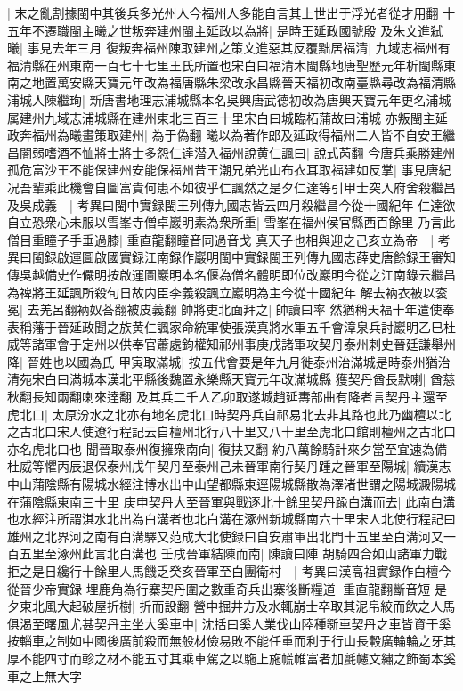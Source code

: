 |{
	末之亂割據閩中其後兵多光州人今福州人多能自言其上世出于浮光者從才用翻}
十五年不遷職閩主曦之世叛奔建州閩主延政以為將|{
	是時王延政國號殷}
及朱文進弑曦|{
	事見去年三月}
復叛奔福州陳取建州之策文進惡其反覆黜居福清|{
	九域志福州有福清縣在州東南一百七十七里王氏所置也宋白曰福清木閩縣地唐聖歷元年析閩縣東南之地置萬安縣天寶元年改為福唐縣朱梁改永昌縣晉天福初改南臺縣尋改為福清縣}
浦城人陳繼珣|{
	新唐書地理志浦城縣本名吳興唐武德初改為唐興天寶元年更名浦城属建州九域志浦城縣在建州東北三百三十里宋白曰城臨柘蒲故曰浦城}
亦叛閩主延政奔福州為曦畫策取建州|{
	為于偽翻}
曦以為著作郎及延政得福州二人皆不自安王繼昌闇弱嗜酒不恤將士將士多怨仁達潜入福州說黄仁諷曰|{
	說式芮翻}
今唐兵乘勝建州孤危富沙王不能保建州安能保福州昔王潮兄弟光山布衣耳取福建如反掌|{
	事見唐紀}
况吾輩乘此機會自圖富貴何患不如彼乎仁諷然之是夕仁達等引甲士突入府舍殺繼昌及吳成義　|{
	考異曰閩中實録閩王列傳九國志皆云四月殺繼昌今從十國紀年}
仁達欲自立恐衆心未服以雪峯寺僧卓巖明素為衆所重|{
	雪峯在福州侯官縣西百餘里}
乃言此僧目重瞳子手垂過膝|{
	重直龍翻瞳音同過音戈}
真天子也相與迎之己亥立為帝　|{
	考異曰閩録啟運圖啟國實録江南録作巖明閩中實録閩王列傳九國志薛史唐餘録王審知傳吳越備史作儼明按啟運圖巖明本名偃為僧名體明即位改巖明今從之江南錄云繼昌為禆將王延諷所殺旬日故内臣李義殺諷立巖明為主今從十國紀年}
解去衲衣被以衮冕|{
	去羌呂翻衲奴荅翻被皮義翻}
帥將吏北面拜之|{
	帥讀曰率}
然猶稱天福十年遣使奉表稱藩于晉延政聞之族黄仁諷家命統軍使張漢真將水軍五千會漳泉兵討巖明乙巳杜威等諸軍會于定州以供奉官蕭處鈞權知祁州事庚戌諸軍攻契丹泰州刺史晉廷謙舉州降|{
	晉姓也以國為氏}
甲寅取滿城|{
	按五代會要是年九月徙泰州治滿城是時泰州猶治清苑宋白曰滿城本漢北平縣後魏置永樂縣天寶元年改滿城縣}
獲契丹酋長默喇|{
	酋慈秋翻長知兩翻喇來逹翻}
及其兵二千人乙卯取遂城趙延夀部曲有降者言契丹主還至虎北口|{
	太原汾水之北亦有地名虎北口時契丹兵自祁易北去非其路也此乃幽檀以北之古北口宋人使遼行程記云自檀州北行八十里又八十里至虎北口館則檀州之古北口亦名虎北口也}
聞晉取泰州復擁衆南向|{
	復扶又翻}
約八萬餘騎計來夕當至宜速為備杜威等懼丙辰退保泰州戊午契丹至泰州己未晉軍南行契丹踵之晉軍至陽城|{
	續漢志中山蒲陰縣有陽城水經注博水出中山望都縣東逕陽城縣散為澤渚世謂之陽城澱陽城在蒲陰縣東南三十里}
庚申契丹大至晉軍與戰逐北十餘里契丹踰白溝而去|{
	此南白溝也水經注所謂淇水北出為白溝者也北白溝在涿州新城縣南六十里宋人北使行程記曰雄州之北界河之南有白溝驛又范成大北使録曰自安肅軍出北門十五里至白溝河又一百五里至涿州此言北白溝也}
壬戌晉軍結陳而南|{
	陳讀曰陣}
胡騎四合如山諸軍力戰拒之是日纔行十餘里人馬饑乏癸亥晉軍至白團衛村　|{
	考異曰漢高祖實録作白檀今從晉少帝實録}
埋鹿角為行寨契丹圍之數重奇兵出寨後斷糧道|{
	重直龍翻斷音短}
是夕東北風大起破屋折樹|{
	折而設翻}
營中掘井方及水輒崩士卒取其泥帛絞而飲之人馬俱渴至曙風尤甚契丹主坐大奚車中|{
	沈括曰奚人業伐山陸種斵車契丹之車皆資于奚按輜車之制如中國後廣前殺而無般材儉易敗不能任重而利于行山長轂廣輪輪之牙其厚不能四寸而軫之材不能五寸其乘車駕之以駞上施㡛帷富者加氈幰文繡之飾蜀本奚車之上無大字}
